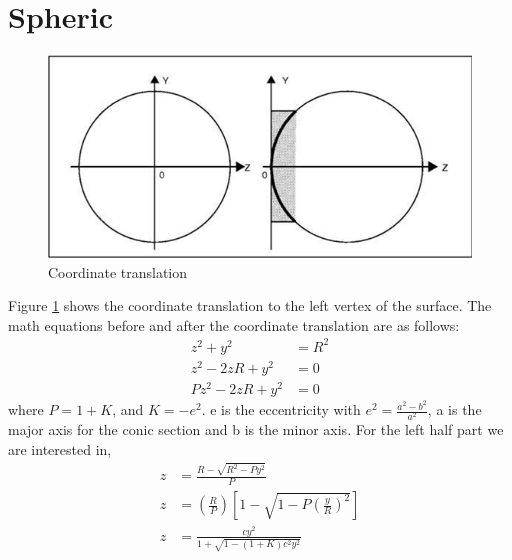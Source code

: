 \documentclass[../main.tex]{subfiles}
\begin{document}
	\section{Spheric}
	\begin{figure}[h!]
	  \centering
	  \includegraphics[scale=0.7]{../graphics/aspheric_1.png}
	  \caption{Coordinate translation}
	  \label{fig:sag}
	\end{figure}
	Figure \ref{fig:sag} shows the coordinate translation to the left vertex of the surface. The math equations before and after the coordinate translation are as follows:
	\begin{align}
		z^2 + y^2 &= R^2\\
		z^2 - 2zR + y^2 &= 0\\
		Pz^2 - 2zR + y^2 &= 0
	\end{align}
	where $P = 1 + K$, and $K = -e^2$. e is the eccentricity with $e^2 = \frac{a^2 - b^2}{a^2}$, a is the major axis for the conic section and b is the minor axis.
	For the left half part we are interested in,
	\begin{align}
		z &= \frac{R-\sqrt{R^2-Py^2}}{P}\\
		z &= \left(\frac{R}{P}\right)\left[1-\sqrt{1-P\left(\frac{y}{R}\right)^2}\right]\\
		z &= \frac{cy^2}{1+\sqrt{1-(1+K)c^2y^2}}
	\end{align}
\end{document}
